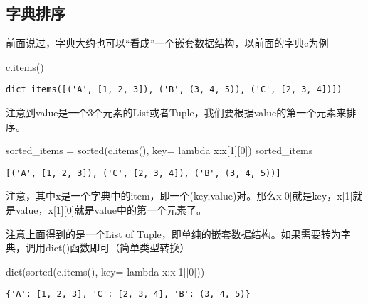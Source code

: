 \documentclass[
  letterpaper,
  DIV=11,
  numbers=noendperiod]{scrreprt}
\newenvironment{Shaded}{\begin{snugshade}}{\end{snugshade}}
\newcommand{\BuiltInTok}[1]{\textcolor[rgb]{0.00,0.23,0.31}{#1}}
\newcommand{\DecValTok}[1]{\textcolor[rgb]{0.68,0.00,0.00}{#1}}
\newcommand{\KeywordTok}[1]{\textcolor[rgb]{0.00,0.23,0.31}{#1}}
\newcommand{\NormalTok}[1]{\textcolor[rgb]{0.00,0.23,0.31}{#1}}
\newcommand{\OperatorTok}[1]{\textcolor[rgb]{0.37,0.37,0.37}{#1}}
\begin{document}
\hypertarget{ux5b57ux5178ux6392ux5e8f}{%
\subsection{字典排序}\label{ux5b57ux5178ux6392ux5e8f}}

前面说过，字典大约也可以``看成''一个嵌套数据结构，以前面的字典c为例

\begin{Shaded}
\begin{Highlighting}[]
\NormalTok{c.items()}
\end{Highlighting}
\end{Shaded}

\begin{verbatim}
dict_items([('A', [1, 2, 3]), ('B', (3, 4, 5)), ('C', [2, 3, 4])])
\end{verbatim}

注意到value是一个3个元素的List或者Tuple，我们要根据value的第一个元素来排序。

\begin{Shaded}
\begin{Highlighting}[]
\NormalTok{sorted\_items }\OperatorTok{=} \BuiltInTok{sorted}\NormalTok{(c.items(), key}\OperatorTok{=} \KeywordTok{lambda}\NormalTok{ x:x[}\DecValTok{1}\NormalTok{][}\DecValTok{0}\NormalTok{])}
\NormalTok{sorted\_items}
\end{Highlighting}
\end{Shaded}

\begin{verbatim}
[('A', [1, 2, 3]), ('C', [2, 3, 4]), ('B', (3, 4, 5))]
\end{verbatim}

注意，其中x是一个字典中的item，即一个(key,value)对。那么x{[}0{]}就是key，x{[}1{]}就是value，x{[}1{]}{[}0{]}就是value中的第一个元素了。

注意上面得到的是一个List of
Tuple，即单纯的嵌套数据结构。如果需要转为字典，调用dict()函数即可（简单类型转换）

\begin{Shaded}
\begin{Highlighting}[]
\BuiltInTok{dict}\NormalTok{(}\BuiltInTok{sorted}\NormalTok{(c.items(), key}\OperatorTok{=} \KeywordTok{lambda}\NormalTok{ x:x[}\DecValTok{1}\NormalTok{][}\DecValTok{0}\NormalTok{]))}
\end{Highlighting}
\end{Shaded}

\begin{verbatim}
{'A': [1, 2, 3], 'C': [2, 3, 4], 'B': (3, 4, 5)}
\end{verbatim}
\end{document}
